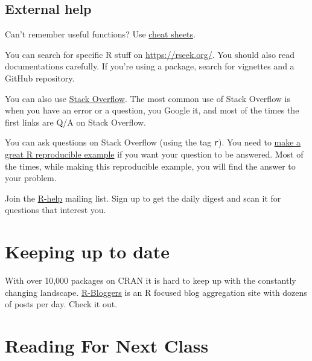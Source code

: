 \documentclass[]{book}
\begin{document}
\subsection{External help}\label{external-help}

Can't remember useful functions? Use
\href{https://www.rstudio.com/resources/cheatsheets/}{cheat sheets}.

You can search for specific R stuff on \url{https://rseek.org/}. You
should also read documentations carefully. If you're using a package,
search for vignettes and a GitHub repository.

You can also use \href{https://stackoverflow.com/}{Stack Overflow}. The
most common use of Stack Overflow is when you have an error or a
question, you Google it, and most of the times the first links are Q/A
on Stack Overflow.

You can ask questions on Stack Overflow (using the tag \texttt{r}). You
need to
\href{https://stackoverflow.com/questions/5963269/how-to-make-a-great-r-reproducible-example}{make
a great R reproducible example} if you want your question to be
answered. Most of the times, while making this reproducible example, you
will find the answer to your problem.

Join the \href{https://www.r-project.org/mail.html}{R-help} mailing
list. Sign up to get the daily digest and scan it for questions that
interest you.

\section{Keeping up to date}\label{keeping-up-to-date}

With over 10,000 packages on CRAN it is hard to keep up with the
constantly changing landscape.
\href{https://www.r-bloggers.com/}{R-Bloggers} is an R focused blog
aggregation site with dozens of posts per day. Check it out.

\section{Reading For Next Class}\label{reading-for-next-class}
\end{document}
